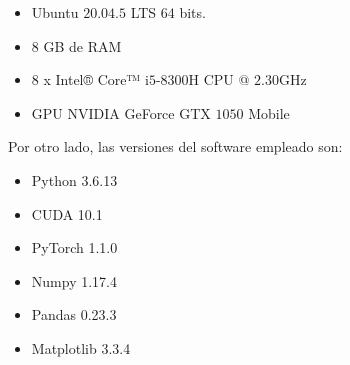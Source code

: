 \begin{itemize}
    \item Ubuntu $20.04.5$ LTS $64$ bits.
    \item $8$ GB de RAM
    \item $8$ x Intel® Core™ i$5$-$8300$H CPU @ $2.30$GHz
    \item GPU NVIDIA GeForce GTX $1050$ Mobile
\end{itemize}

\medskip

\noindent Por otro lado, las versiones del software empleado son: 

\begin{itemize}
    \item Python 3.6.13
    \item CUDA 10.1
    \item PyTorch 1.1.0
    \item Numpy 1.17.4
    \item Pandas 0.23.3
    \item Matplotlib 3.3.4
\end{itemize}


\endinput

